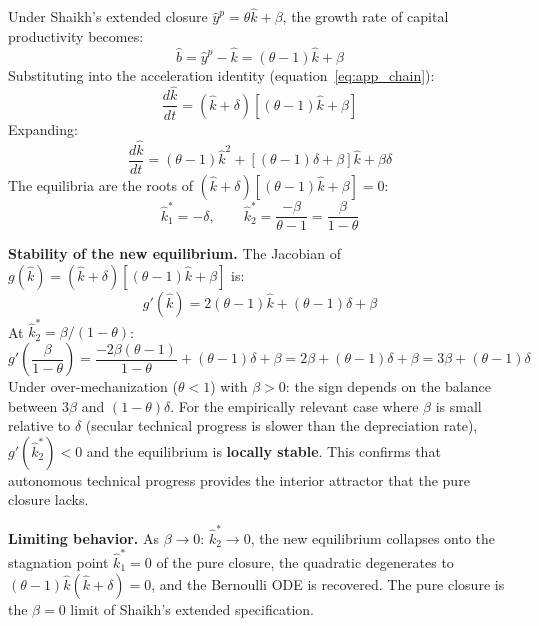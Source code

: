 \documentclass[11pt,a4paper]{article}
\begin{document}
Under Shaikh's extended closure $\hat{y}^p = \theta\hat{k} + \beta$, the growth rate of capital productivity becomes:
%
\begin{equation}\label{eq:app_bhat_extended}
	\hat{b} = \hat{y}^p - \hat{k} = (\theta - 1)\hat{k} + \beta
\end{equation}
%
Substituting into the acceleration identity (equation~\ref{eq:app_chain}):
%
\begin{equation}\label{eq:app_extended_ode}
	\frac{d\hat{k}}{dt} = (\hat{k} + \delta)\left[(\theta - 1)\hat{k} + \beta\right]
\end{equation}
%
Expanding:
%
\begin{equation}\label{eq:app_quadratic}
	\frac{d\hat{k}}{dt} = (\theta - 1)\hat{k}^2 + \left[(\theta - 1)\delta + \beta\right]\hat{k} + \beta\delta
\end{equation}
%
The equilibria are the roots of $(\hat{k} + \delta)[(\theta - 1)\hat{k} + \beta] = 0$:
%
\begin{equation}\label{eq:app_extended_roots}
	\hat{k}_1^* = -\delta, \qquad \hat{k}_2^* = \frac{-\beta}{\theta - 1} = \frac{\beta}{1 - \theta}
\end{equation}

\textbf{Stability of the new equilibrium.} The Jacobian of $g(\hat{k}) = (\hat{k}+\delta)[(\theta-1)\hat{k}+\beta]$ is:
%
\begin{equation}\label{eq:app_ext_jacobian}
	g'(\hat{k}) = 2(\theta - 1)\hat{k} + (\theta-1)\delta + \beta
\end{equation}
%
At $\hat{k}_2^* = \beta/(1 - \theta)$:
%
\begin{equation}
	g'\!\left(\frac{\beta}{1-\theta}\right) = \frac{-2\beta(\theta-1)}{1-\theta} + (\theta-1)\delta + \beta = 2\beta + (\theta-1)\delta + \beta = 3\beta + (\theta-1)\delta
\end{equation}
%
Under over-mechanization ($\theta < 1$) with $\beta > 0$: the sign depends on the balance between $3\beta$ and $(1-\theta)\delta$. For the empirically relevant case where $\beta$ is small relative to $\delta$ (secular technical progress is slower than the depreciation rate), $g'(\hat{k}_2^*) < 0$ and the equilibrium is \textbf{locally stable}. This confirms that autonomous technical progress provides the interior attractor that the pure closure lacks.

\textbf{Limiting behavior.} As $\beta \to 0$: $\hat{k}_2^* \to 0$, the new equilibrium collapses onto the stagnation point $\hat{k}_1^* = 0$ of the pure closure, the quadratic degenerates to $(\theta-1)\hat{k}(\hat{k}+\delta) = 0$, and the Bernoulli ODE is recovered. The pure closure is the $\beta = 0$ limit of Shaikh's extended specification.
\end{document}
